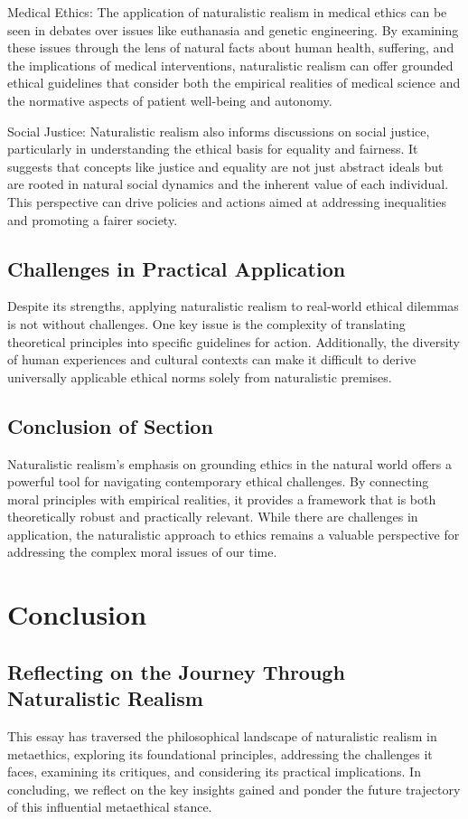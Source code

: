 \documentclass[12pt,a4paper]{article}
\begin{document}
Medical Ethics: The application of naturalistic realism in medical ethics can be seen in debates over issues like euthanasia and genetic engineering. By examining these issues through the lens of natural facts about human health, suffering, and the implications of medical interventions, naturalistic realism can offer grounded ethical guidelines that consider both the empirical realities of medical science and the normative aspects of patient well-being and autonomy.

Social Justice: Naturalistic realism also informs discussions on social justice, particularly in understanding the ethical basis for equality and fairness. It suggests that concepts like justice and equality are not just abstract ideals but are rooted in natural social dynamics and the inherent value of each individual. This perspective can drive policies and actions aimed at addressing inequalities and promoting a fairer society.

\subsection{Challenges in Practical Application}
Despite its strengths, applying naturalistic realism to real-world ethical dilemmas is not without challenges. One key issue is the complexity of translating theoretical principles into specific guidelines for action. Additionally, the diversity of human experiences and cultural contexts can make it difficult to derive universally applicable ethical norms solely from naturalistic premises.

\subsection{Conclusion of Section}
Naturalistic realism's emphasis on grounding ethics in the natural world offers a powerful tool for navigating contemporary ethical challenges. By connecting moral principles with empirical realities, it provides a framework that is both theoretically robust and practically relevant. While there are challenges in application, the naturalistic approach to ethics remains a valuable perspective for addressing the complex moral issues of our time.

\newpage
\section*{Conclusion}

\subsection*{Reflecting on the Journey Through Naturalistic Realism}
This essay has traversed the philosophical landscape of naturalistic realism in metaethics, exploring its foundational principles, addressing the challenges it faces, examining its critiques, and considering its practical implications. In concluding, we reflect on the key insights gained and ponder the future trajectory of this influential metaethical stance.
\end{document}
